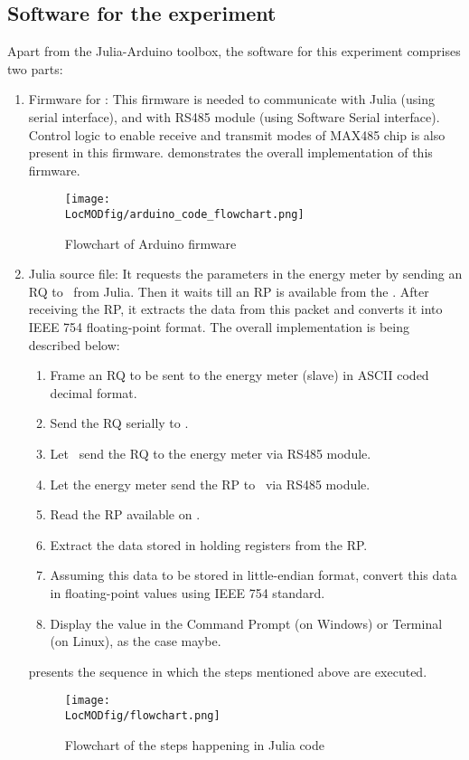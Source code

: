 \subsection{Software for the experiment}
Apart from the Julia-Arduino toolbox, the software for this experiment comprises two parts:
\begin{enumerate}
\item  Firmware for \arduino: This firmware is needed to communicate
with Julia (using serial interface), and with RS485 module (using
Software Serial interface). Control logic to enable receive and
transmit modes of MAX485 chip is also present in this firmware.  demonstrates the overall implementation of this firmware.

\begin{figure}
  \centering
  \texttt{[image: \\LocMODfig/arduino\_code\_flowchart.png]}
  \caption{Flowchart of Arduino firmware}
  \label{fig:modbus-firmware}
\end{figure}

\item Julia source file: It requests the parameters in the energy meter
by sending an RQ to \arduino\ from Julia. Then it waits till
an RP is available from the \arduino. After receiving the RP, it extracts 
the data from this packet and converts it into IEEE
754 floating-point format. The overall implementation is being
described below:
\begin {enumerate}
\item Frame an RQ to be sent to the energy meter (slave) in ASCII coded decimal
format. 
\item Send the RQ serially to \arduino. 
\item Let \arduino\ send the RQ to the energy meter via RS485 module. 
\item Let the energy meter send the RP to \arduino\ via RS485 module. 
\item Read the RP available on \arduino. 
\item Extract the data stored in holding registers from the RP. 
\item Assuming this data to be stored in little-endian format, 
convert this data in floating-point values using IEEE 754 standard. 
\item Display the value in the Command Prompt (on Windows) or Terminal (on Linux), as the case maybe. 
\end{enumerate}
 presents the sequence in which the steps mentioned above are executed. 
\begin{figure}
  \centering
  \texttt{[image: \\LocMODfig/flowchart.png]}
  \caption{Flowchart of the steps happening in Julia code}
  \label{fig:flow-chart}
\end{figure}
\end{enumerate}


